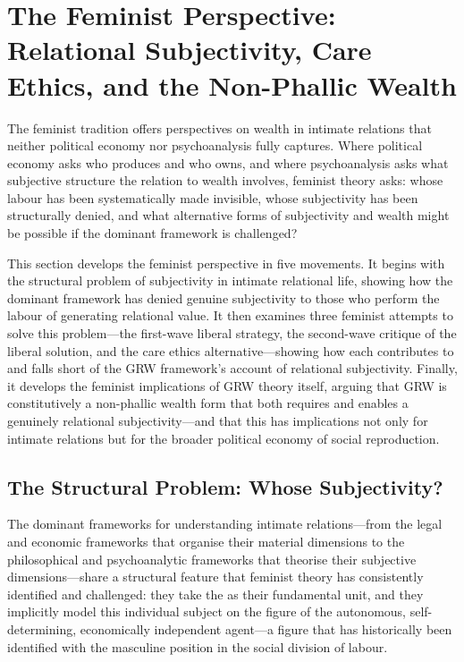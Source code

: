 \section{The Feminist Perspective: Relational Subjectivity, Care Ethics, and the Non-Phallic Wealth}
\label{p15:sec:feminism}

\noindent
The feminist tradition offers perspectives on wealth in intimate relations that neither political economy nor psychoanalysis fully captures. Where political economy asks who produces and who owns, and where psychoanalysis asks what subjective structure the relation to wealth involves, feminist theory asks: whose labour has been systematically made invisible, whose subjectivity has been structurally denied, and what alternative forms of subjectivity and wealth might be possible if the dominant framework is challenged?

This section develops the feminist perspective in five movements. It begins with the structural problem of subjectivity in intimate relational life, showing how the dominant framework has denied genuine subjectivity to those who perform the labour of generating relational value. It then examines three feminist attempts to solve this problem---the first-wave liberal strategy, the second-wave critique of the liberal solution, and the care ethics alternative---showing how each contributes to and falls short of the GRW framework's account of relational subjectivity. Finally, it develops the feminist implications of GRW theory itself, arguing that GRW is constitutively a non-phallic wealth form that both requires and enables a genuinely relational subjectivity---and that this has implications not only for intimate relations but for the broader political economy of social reproduction.

\subsection{The Structural Problem: Whose Subjectivity?}
\label{p15:subsec:subjectivity_problem}

\noindent
The dominant frameworks for understanding intimate relations---from the legal and economic frameworks that organise their material dimensions to the philosophical and psychoanalytic frameworks that theorise their subjective dimensions---share a structural feature that feminist theory has consistently identified and challenged: they take the  as their fundamental unit, and they implicitly model this individual subject on the figure of the autonomous, self-determining, economically independent agent---a figure that has historically been identified with the masculine position in the social division of labour.

